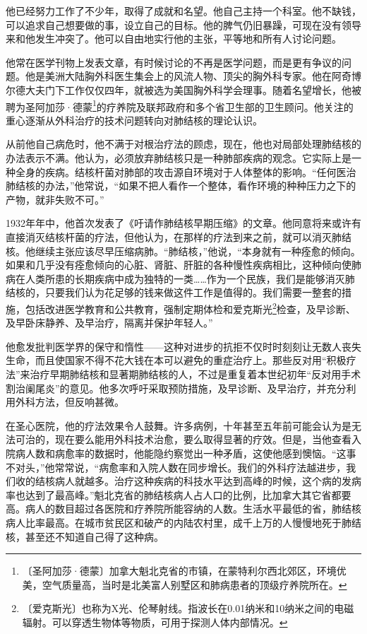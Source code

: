 \documentclass[12pt,UTF-8,openany]{ctexbook}
\begin{document}
\begin{large}
    
    他已经努力工作了不少年，取得了成就和名望。他自己主持一个科室。他不缺钱，可以追求自己想要做的事，设立自己的目标。他的脾气仍旧暴躁，可现在没有领导来和他发生冲突了。他可以自由地实行他的主张，平等地和所有人讨论问题。
    
    他常在医学刊物上发表文章，有时候讨论的不再是医学问题，而是更有争议的问题。他是美洲大陆胸外科医生集会上的风流人物、顶尖的胸外科专家。他在阿奇博尔德大夫门下工作仅仅四年，就被选为美国胸外科学会理事。随着名望增长，他被聘为圣阿加莎·德蒙\footnote{〔圣阿加莎·德蒙〕加拿大魁北克省的市镇，在蒙特利尔西北郊区，环境优美，空气质量高，当时是北美富人别墅区和肺病患者的顶级疗养院所在。}的疗养院及联邦政府和多个省卫生部的卫生顾问。他关注的重心逐渐从外科治疗的技术问题转向对肺结核的理论认识。
    
    从前他自己病危时，他不满于对根治疗法的顾虑，现在，他也对局部处理肺结核的办法表示不满。他认为，必须放弃肺结核只是一种肺部疾病的观念。它实际上是一种全身的疾病。结核杆菌对肺部的攻击源自环境对于人体整体的影响。“任何医治肺结核的办法，”他常说，“如果不把人看作一个整体，看作环境的种种压力之下的产物，就非失败不可。”
    
    1932年年中，他首次发表了《吁请作肺结核早期压缩》的文章。他同意将来或许有直接消灭结核杆菌的疗法，但他认为，在那样的疗法到来之前，就可以消灭肺结核。他继续主张应该尽早压缩病肺。“肺结核，”他说，“本身就有一种痊愈的倾向。如果和几乎没有痊愈倾向的心脏、肾脏、肝脏的各种慢性疾病相比，这种倾向使肺病在人类所患的长期疾病中成为独特的一类……作为一个民族，我们是能够消灭肺结核的，只要我们认为花足够的钱来做这件工作是值得的。我们需要一整套的措施，包括改进医学教育和公共教育，强制定期体检和爱克斯光\footnote{〔爱克斯光〕也称为X光、伦琴射线。指波长在0.01纳米和10纳米之间的电磁辐射。可以穿透生物体等物质，可用于探测人体内部情况。}检查，及早诊断、及早卧床静养、及早治疗，隔离并保护年轻人。”
    
    他愈发批判医学界的保守和惰性——这种对进步的抗拒不仅时时刻刻让无数人丧失生命，而且使国家不得不花大钱在本可以避免的重症治疗上。那些反对用“积极疗法”来治疗早期肺结核和显著期肺结核的人，不过是重复着本世纪初年“反对用手术割治阑尾炎”的意见。他多次呼吁采取预防措施，及早诊断、及早治疗，并充分利用外科方法，但反响甚微。
    
    在圣心医院，他的疗法效果令人鼓舞。许多病例，十年甚至五年前可能会认为是无法可治的，现在要么能用外科技术治愈，要么取得显著的疗效。但是，当他查看入院病人数和病愈率的数据时，他能隐约察觉出一种矛盾，这使他感到懊恼。“这事不对头，”他常常说，“病愈率和入院人数在同步增长。我们的外科疗法越进步，我们收的结核病人就越多。治疗这种疾病的科技水平达到高峰的时候，这个病的发病率也达到了最高峰。”魁北克省的肺结核病人占人口的比例，比加拿大其它省都要高。病人的数目超过各医院和疗养院所能容纳的人数。生活水平最低的省，肺结核病人比率最高。在城市贫民区和破产的内陆农村里，成千上万的人慢慢地死于肺结核，甚至还不知道自己得了这种病。
    

\end{large}
\end{document}
